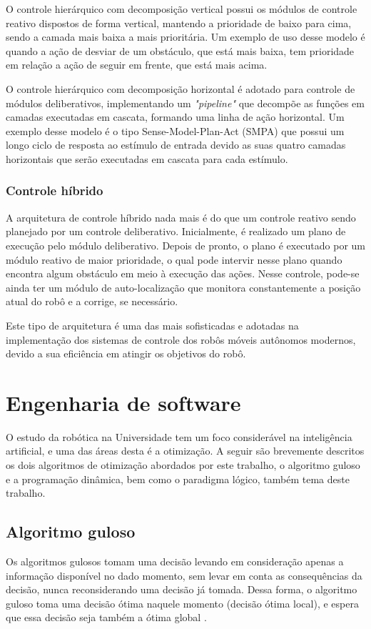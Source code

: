 O controle hierárquico com decomposição vertical possui os módulos de controle reativo dispostos de forma vertical, mantendo a prioridade de baixo para cima, sendo a camada mais baixa a mais prioritária. Um exemplo de uso desse modelo é quando a ação de desviar de um obstáculo, que está mais baixa, tem prioridade em relação a ação de seguir em frente, que está mais acima.

O controle hierárquico com decomposição horizontal é adotado para controle de módulos deliberativos, implementando um \textit{"pipeline"} que decompõe as funções em camadas executadas em cascata, formando uma linha de ação horizontal. Um exemplo desse modelo é o tipo Sense-Model-Plan-Act (SMPA) que possui um longo ciclo de resposta ao estímulo de entrada devido as suas quatro camadas horizontais que serão executadas em cascata para cada estímulo.

\subsubsection{Controle híbrido}
A arquitetura de controle híbrido nada mais é do que um controle reativo sendo planejado por um controle deliberativo. Inicialmente, é realizado um plano de execução pelo módulo deliberativo. Depois de pronto, o plano é executado por um módulo reativo de maior prioridade, o qual pode intervir nesse plano quando encontra algum obstáculo em meio à execução das ações. Nesse controle, pode-se ainda ter um módulo de auto-localização que monitora constantemente a posição atual do robô e a corrige, se necessário.

Este tipo de arquitetura é uma das mais sofisticadas e adotadas na implementação dos sistemas de controle dos robôs móveis autônomos modernos, devido a sua eficiência em atingir os objetivos do robô. 

\section{Engenharia de software}
O estudo da robótica na Universidade tem um foco considerável na inteligência artificial, e uma das áreas desta é a otimização. A seguir são brevemente descritos os dois algoritmos de otimização abordados por este trabalho, o algoritmo guloso e a programação dinâmica, bem como o paradigma lógico, também tema deste trabalho.
\subsection{Algoritmo guloso}
Os algoritmos gulosos tomam uma decisão levando em consideração apenas a informação disponível no dado momento, sem levar em conta as consequências da decisão, nunca reconsiderando uma decisão já tomada. Dessa forma, o algoritmo guloso toma uma decisão ótima naquele momento (decisão ótima local), e espera que essa decisão seja também a ótima global \cite{anderson2004}.
